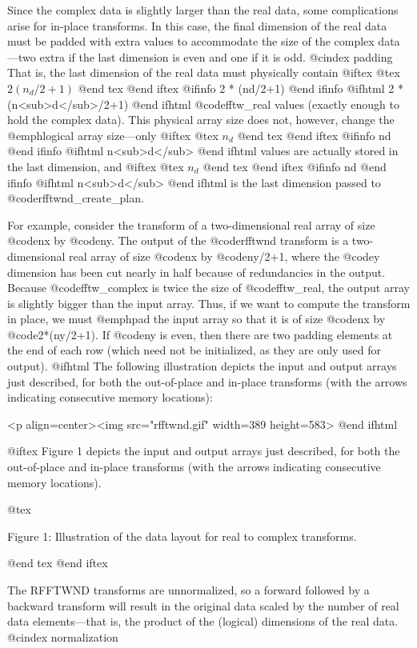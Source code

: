 Since the complex data is slightly larger than the real data, some
complications arise for in-place transforms.  In this case, the final
dimension of the real data must be padded with extra values to
accommodate the size of the complex data---two extra if the last
dimension is even and one if it is odd.
@cindex padding
That is, the last dimension of the real data must physically contain
@iftex
@tex
$2 (n_d/2+1)$
@end tex
@end iftex
@ifinfo
2 * (nd/2+1)
@end ifinfo
@ifhtml
2 * (n<sub>d</sub>/2+1)
@end ifhtml
@code{fftw_real} values (exactly enough to hold the complex data).
This physical array size does not, however, change the @emph{logical}
array size---only
@iftex
@tex
$n_d$
@end tex
@end iftex
@ifinfo
nd
@end ifinfo
@ifhtml
n<sub>d</sub>
@end ifhtml
values are actually stored in the last dimension, and
@iftex
@tex
$n_d$
@end tex
@end iftex
@ifinfo
nd
@end ifinfo
@ifhtml
n<sub>d</sub>
@end ifhtml
is the last dimension passed to @code{rfftwnd_create_plan}.

For example, consider the transform of a two-dimensional real array of
size @code{nx} by @code{ny}.  The output of the @code{rfftwnd} transform
is a two-dimensional real array of size @code{nx} by @code{ny/2+1},
where the @code{y} dimension has been cut nearly in half because of
redundancies in the output.  Because @code{fftw_complex} is twice the
size of @code{fftw_real}, the output array is slightly bigger than the
input array.  Thus, if we want to compute the transform in place, we
must @emph{pad} the input array so that it is of size @code{nx} by
@code{2*(ny/2+1)}.  If @code{ny} is even, then there are two padding
elements at the end of each row (which need not be initialized, as they
are only used for output).
@ifhtml
The following illustration depicts the input and output arrays just
described, for both the out-of-place and in-place transforms (with the
arrows indicating consecutive memory locations):

<p align=center><img src="rfftwnd.gif" width=389 height=583>
@end ifhtml

@iftex
Figure 1 depicts the input and output arrays just
described, for both the out-of-place and in-place transforms (with the
arrows indicating consecutive memory locations).

@tex
{
\pageinsert
\vfill
\vskip405pt
\hskip40pt
\vskip 24pt
Figure 1: Illustration of the data layout for real to complex
transforms.  
\vfill
\endinsert}
@end tex
@end iftex

The RFFTWND transforms are unnormalized, so a forward followed by a
backward transform will result in the original data scaled by the number
of real data elements---that is, the product of the (logical) dimensions
of the real data.
@cindex normalization

